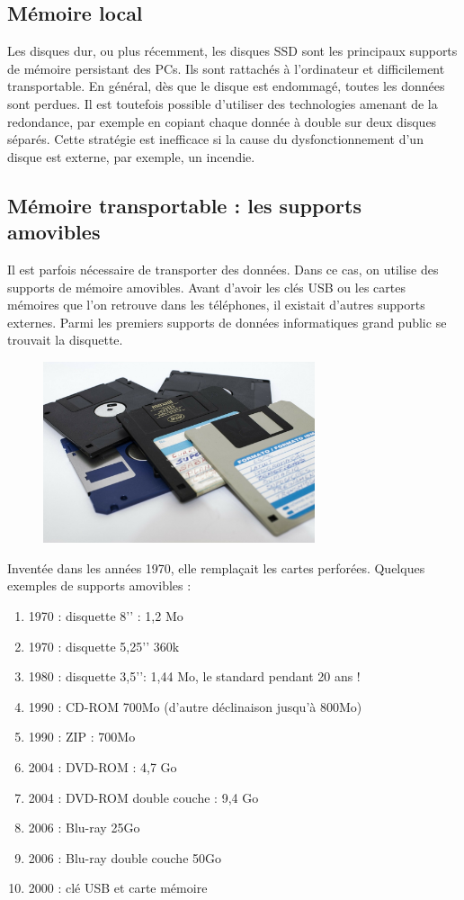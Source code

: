 \subsection{Mémoire local}
Les disques dur, ou plus récemment, les disques SSD sont les principaux supports de mémoire persistant des PCs. Ils sont rattachés à l'ordinateur et difficilement transportable. En général, dès que le disque est endommagé, toutes les données sont perdues. Il est toutefois possible d'utiliser des technologies amenant de la redondance, par exemple en copiant chaque donnée à double sur deux disques séparés. Cette stratégie est inefficace si la cause du dysfonctionnement d'un disque est externe, par exemple, un incendie.

\subsection{Mémoire transportable : les supports amovibles}
Il est parfois nécessaire de transporter des données. Dans ce cas, on utilise des supports de mémoire amovibles.
Avant d’avoir les clés USB ou les cartes mémoires que l’on retrouve dans les téléphones, il existait d’autres supports externes. Parmi les premiers supports de données informatiques grand public se trouvait la disquette.

\begin{figure}[ht!]
	\centering
	\includegraphics[width=8cm]{Images/stockage/floppy-disk.jpg}
\end{figure}

Inventée dans les années 1970, elle remplaçait les cartes perforées. Quelques exemples de supports amovibles :
\begin{enumerate}
	\item[] 1970 : disquette 8’’ : 1,2 Mo
	\item[] 1970 : disquette 5,25’’ 360k
	\item[] 1980 : disquette 3,5’’: 1,44 Mo, le standard pendant 20 ans !
	\item[] 1990 : CD-ROM 700Mo (d’autre déclinaison jusqu’à 800Mo)
	\item[] 1990 : ZIP : 700Mo
	\item[] 2004 : DVD-ROM : 4,7 Go
	\item[] 2004 : DVD-ROM double couche : 9,4 Go
	\item[] 2006 : Blu-ray 25Go
	\item[] 2006 : Blu-ray double couche 50Go
	\item[] 2000 : clé USB et carte mémoire
\end{enumerate}

